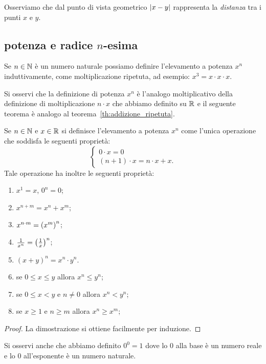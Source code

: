 Osserviamo che dal punto di vista geometrico
${\left|x-y\right|}$ rappresenta la \emph{distanza} tra i punti
$x$ e $y$.


\subsection{potenza e radice $n$-esima}
%
%
\label{sec:potenza}%
\label{sec:radice}%

Se $n \in {\mathbb N}$ è un numero naturale possiamo definire 
l'elevamento a potenza $x^n$ induttivamente, come moltiplicazione 
ripetuta, ad esempio: $x^3 = x\cdot x \cdot x$.

Si osservi che la definizione di potenza $x^n$ 
è l'analogo moltiplicativo della definizione 
di moltiplicazione $n\cdot x$ che abbiamo definito su ${\mathbb R}$
e il seguente teorema è analogo al 
teorema~\ref{th:addizione_ripetuta}.

\begin{theorem}
\label{th:moltiplicazione_ripetuta}%
Se $n\in {\mathbb N}$ e $x\in {\mathbb R}$ si definisce 
l'elevamento a potenza $x^n$ come l'unica operazione 
che soddisfa le seguenti proprietà:
\[
  \begin{cases}
    0\cdot x  = 0 \\
    (n+1) \cdot x = n\cdot x + x.
  \end{cases}  
\]
Tale operazione ha inoltre le seguenti proprietà:
\begin{enumerate}
  \item $x^1 = x$, $0^n = 0$;
  \item $x^{n+m} = x^n + x^m$; 
  \item $x^{n\cdot m} = {\left( x^m \right)}^n$;
  \item $\frac{1}{x^n} = {\left( \frac 1 x \right)}^n$;
  \item $(x+y)^n = x^n \cdot y^n$.
  \item se $0\le x \le y$ allora $x^n \le y^n$;
  \item se $0\le x < y$ e $n \neq 0$ allora $x^n < y^n$;
  \item se $x\ge 1$ e $n\ge m$ allora $x^n \ge x^m$;
\end{enumerate}
\end{theorem}
\begin{proof}
La dimostrazione si ottiene facilmente per induzione.
\end{proof}

Si osservi anche che abbiamo definito $0^0=1$ dove lo $0$ 
alla base è un numero reale e lo $0$ all'esponente 
è un numero naturale.

